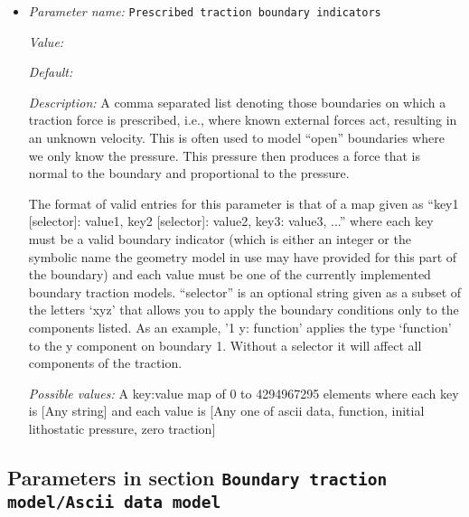 \begin{itemize}
\item {\it Parameter name:} {\tt Prescribed traction boundary indicators}
\label{parameters:Boundary traction model/Prescribed traction boundary indicators}
\label{parameters:Boundary_20traction_20model/Prescribed_20traction_20boundary_20indicators}


{\it Value:} 


{\it Default:} 


{\it Description:} A comma separated list denoting those boundaries on which a traction force is prescribed, i.e., where known external forces act, resulting in an unknown velocity. This is often used to model ``open'' boundaries where we only know the pressure. This pressure then produces a force that is normal to the boundary and proportional to the pressure.

The format of valid entries for this parameter is that of a map given as ``key1 [selector]: value1, key2 [selector]: value2, key3: value3, ...'' where each key must be a valid boundary indicator (which is either an integer or the symbolic name the geometry model in use may have provided for this part of the boundary) and each value must be one of the currently implemented boundary traction models. ``selector'' is an optional string given as a subset of the letters `xyz' that allows you to apply the boundary conditions only to the components listed. As an example, '1 y: function' applies the type `function' to the y component on boundary 1. Without a selector it will affect all components of the traction.


{\it Possible values:} A key:value map of 0 to 4294967295 elements  where each key is [Any string] and each value is [Any one of ascii data, function, initial lithostatic pressure, zero traction]
\end{itemize}



\subsection{Parameters in section \tt Boundary traction model/Ascii data model}
\label{parameters:Boundary_20traction_20model/Ascii_20data_20model}


